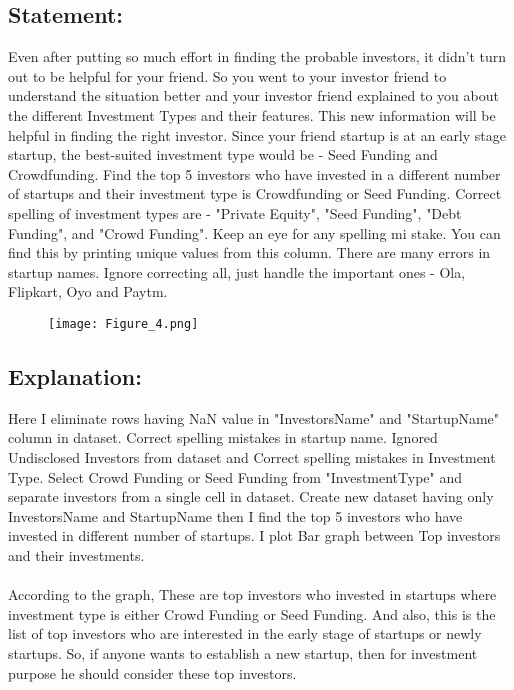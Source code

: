 \documentclass[12pt,a4paper]{article}
\begin{document}
\subsection{Statement:}
Even after putting so much effort in finding the probable investors, it didn't turn out to be helpful for your friend. So you went to your investor friend to understand the situation better and your investor friend explained to you about the different Investment Types and their features. This new information will be helpful in finding the right investor. Since your friend startup is at an early stage startup, the best-suited investment type would be - Seed Funding and Crowdfunding. Find the top 5 investors who have invested in a different number
of startups and their investment type is Crowdfunding or Seed Funding. Correct spelling of investment types are - "Private Equity", "Seed Funding", "Debt Funding", and "Crowd Funding". Keep an eye for any spelling mi
stake. You can find this by printing unique values from this column. There are many errors in startup names. Ignore correcting all, just handle the important ones - Ola, Flipkart, Oyo and Paytm.
\begin{figure}[!ht]
	\begin{center}
			\texttt{[image: Figure\_4.png]}
	\end{center}
\end{figure}
\clearpage
\subsection{Explanation:}
Here I eliminate rows having NaN value in "InvestorsName" and "StartupName" column in dataset. Correct spelling mistakes in startup name. Ignored Undisclosed Investors from dataset and Correct spelling mistakes in Investment Type. Select Crowd Funding or Seed Funding from "InvestmentType" and separate investors from a single cell in dataset. Create new dataset having only InvestorsName and StartupName then I find the top 5 investors who have invested in different number of startups. I plot Bar graph between Top investors and their investments.\\
\\According to the graph, These are top investors who invested in startups where investment type is either Crowd Funding or Seed Funding. And also, this is the list of top investors who are interested in the early stage of startups
or newly startups. So, if anyone wants to establish a new startup, then for investment purpose he should consider these top investors.
\end{document}
